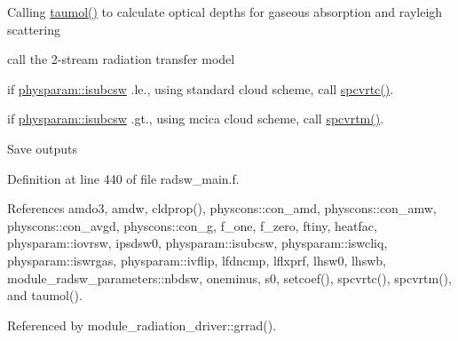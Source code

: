 \begin{DoxyEnumerate}
\item Calling \hyperlink{namespacemodule__radsw__main_afbfb76d4fab10254e065dce350ae5f2b}{taumol()} to calculate optical depths for gaseous absorption and rayleigh scattering
\item call the 2-\/stream radiation transfer model
\begin{DoxyItemize}
\item if \hyperlink{namespacephysparam_a2ec924900b312f94874ffb0f67d09dd9}{physparam\+::isubcsw} .le., using standard cloud scheme, call \hyperlink{namespacemodule__radsw__main_aa104d257f11aa7e84692c08b3716af66}{spcvrtc()}.
\item if \hyperlink{namespacephysparam_a2ec924900b312f94874ffb0f67d09dd9}{physparam\+::isubcsw} .gt., using mcica cloud scheme, call \hyperlink{namespacemodule__radsw__main_a3f2a98a5eece3e3904d164adce213d7a}{spcvrtm()}.
\end{DoxyItemize}
\item Save outputs 
\end{DoxyEnumerate}

Definition at line 440 of file radsw\+\_\+main.\+f.



References amdo3, amdw, cldprop(), physcons\+::con\+\_\+amd, physcons\+::con\+\_\+amw, physcons\+::con\+\_\+avgd, physcons\+::con\+\_\+g, f\+\_\+one, f\+\_\+zero, ftiny, heatfac, physparam\+::iovrsw, ipsdsw0, physparam\+::isubcsw, physparam\+::iswcliq, physparam\+::iswrgas, physparam\+::ivflip, lfdncmp, lflxprf, lhsw0, lhswb, module\+\_\+radsw\+\_\+parameters\+::nbdsw, oneminus, s0, setcoef(), spcvrtc(), spcvrtm(), and taumol().



Referenced by module\+\_\+radiation\+\_\+driver\+::grrad().




